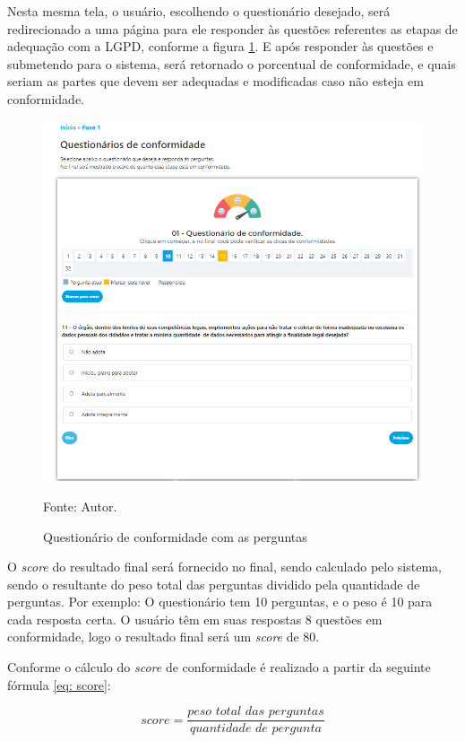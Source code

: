 \documentclass[
	12pt,				%
	openright,			%
	oneside,			%
	a4paper,			%
	english,			%
	french,				%
	spanish,			%
	brazil,				%
	]{abntex2}
\begin{document}
Nesta mesma tela, o usuário, escolhendo o questionário desejado, será redirecionado a uma página para ele responder às questões referentes as etapas de adequação com a LGPD, conforme a figura \ref{fig: fase11}. E após responder às questões e submetendo para o sistema, será retornado o porcentual de conformidade, e quais seriam as partes que devem ser adequadas e modificadas caso não esteja em conformidade.


\begin{figure}[ht]
    \centering
    \caption{Questionário de conformidade com as perguntas}
    \includegraphics[width=6.2in]{Images/fase11.png}
    \label{fig: fase11}
    
    \centering \small Fonte: Autor.
\end{figure}

O \textit{score} do resultado final será fornecido no final, sendo calculado pelo sistema, sendo o resultante do peso total das perguntas dividido pela quantidade de perguntas. Por exemplo: O questionário tem 10 perguntas, e o peso é 10 para cada resposta certa. O usuário têm em suas respostas 8 questões em conformidade, logo o resultado final será um \textit{score} de 80.

Conforme o cálculo do \textit{score} de conformidade é realizado a partir da seguinte fórmula \ref{eq: score}: 

\begin{equation}
\label{eq: score}
    score = \frac {\textit{peso total das perguntas}} {\textit{quantidade de pergunta}}
\end{equation}
\end{document}
